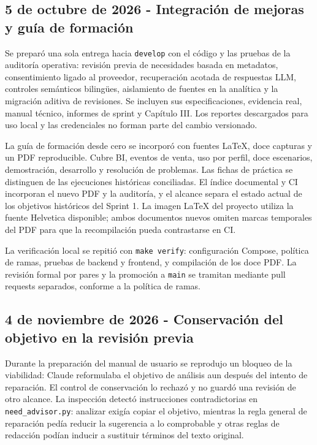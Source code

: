 \documentclass[11pt,letterpaper]{article}
\newcommand{\file}[1]{\texttt{#1}}
\begin{document}
\subsection{5 de octubre de 2026 - Integración de mejoras y guía de formación}

Se preparó una sola entrega hacia \file{develop} con el código y las pruebas de la
auditoría operativa: revisión previa de necesidades basada en metadatos,
consentimiento ligado al proveedor, recuperación acotada de respuestas LLM,
controles semánticos bilingües, aislamiento de fuentes en la analítica y la
migración aditiva de revisiones. Se incluyen sus especificaciones, evidencia real,
manual técnico, informes de sprint y Capítulo III. Los reportes descargados para
uso local y las credenciales no forman parte del cambio versionado.

La guía de formación desde cero se incorporó con fuentes LaTeX, doce capturas y
un PDF reproducible. Cubre BI, eventos de venta, uso por perfil, doce escenarios,
demostración, desarrollo y resolución de problemas. Las fichas de práctica se
distinguen de las ejecuciones históricas conciliadas. El índice documental y CI
incorporan el nuevo PDF y la auditoría, y el alcance separa el estado actual de
los objetivos históricos del Sprint 1. La imagen LaTeX del proyecto utiliza la
fuente Helvetica disponible; ambos documentos nuevos omiten marcas temporales
del PDF para que la recompilación pueda contrastarse en CI.

La verificación local se repitió con \file{make verify}: configuración Compose,
política de ramas, pruebas de backend y frontend, y compilación de los doce PDF.
La revisión formal por pares y la promoción a \file{main} se tramitan mediante
pull requests separados, conforme a la política de ramas.

\subsection{4 de noviembre de 2026 - Conservación del objetivo en la revisión previa}

Durante la preparación del manual de usuario se reprodujo un bloqueo de la
viabilidad: Claude reformulaba el objetivo de análisis aun después del intento
de reparación. El control de conservación lo rechazó y no guardó una revisión
de otro alcance. La inspección detectó instrucciones contradictorias en
\file{need\_advisor.py}: analizar exigía copiar el objetivo, mientras la regla
general de reparación pedía reducir la sugerencia a lo comprobable y otras
reglas de redacción podían inducir a sustituir términos del texto original.
\end{document}
